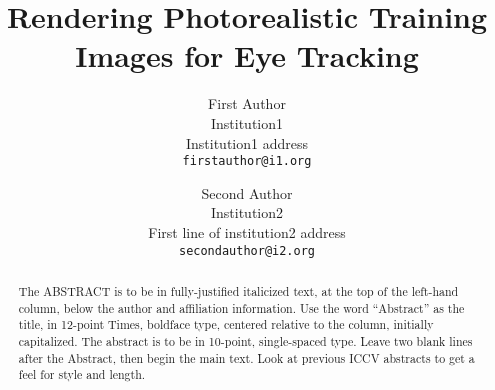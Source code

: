 \documentclass[10pt,twocolumn,letterpaper]{article}
\begin{document}
\title{Rendering Photorealistic Training Images for Eye Tracking}

\author{First Author\\
Institution1\\
Institution1 address\\
{\tt\small firstauthor@i1.org}
\and
Second Author\\
Institution2\\
First line of institution2 address\\
{\tt\small secondauthor@i2.org}
}

\maketitle

\begin{abstract}
   The ABSTRACT is to be in fully-justified italicized text, at the top
   of the left-hand column, below the author and affiliation
   information. Use the word ``Abstract'' as the title, in 12-point
   Times, boldface type, centered relative to the column, initially
   capitalized. The abstract is to be in 10-point, single-spaced type.
   Leave two blank lines after the Abstract, then begin the main text.
   Look at previous ICCV abstracts to get a feel for style and length.
\end{abstract}





%




{\small


}
\end{document}
